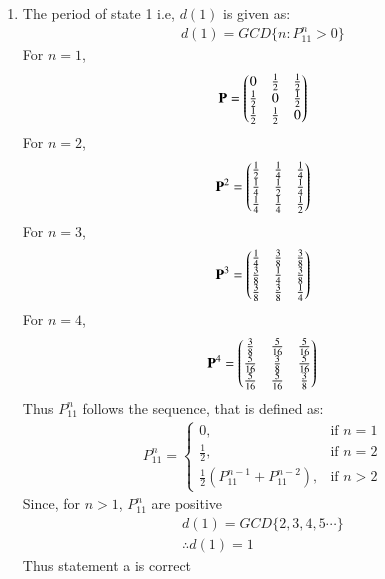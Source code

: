\documentclass[journal,12pt,twocolumn]{IEEEtran}
\begin{document}
    \begin{enumerate}
    \item{ The period of state 1 i.e, $d(1)$ is given as:
    \begin{align}
    d(1)=GCD\{n : P_{11}^n > 0\} \label{eq1a}
    \end{align}
     For $n=1$,
    \begin{align}
    \mathbf{P}=\begin{pmatrix}0&\frac{1}{2}&\frac{1}{2}\\\frac{1}{2}&0&\frac{1}{2}\\\frac{1}{2}&\frac{1}{2}&0\end{pmatrix}\\
    \end{align}
    For $n=2$,
    \begin{align}
    \mathbf{P}^2=\begin{pmatrix}\frac{1}{2}&\frac{1}{4}&\frac{1}{4}\\\frac{1}{4}&\frac{1}{2}&\frac{1}{4}\\\frac{1}{4}&\frac{1}{4}&\frac{1}{2}\end{pmatrix}\\
    \end{align}
    For $n=3$,
    \begin{align}
    \mathbf{P}^3=\begin{pmatrix}\frac{1}{4}&\frac{3}{8}&\frac{3}{8}\\\frac{3}{8}&\frac{1}{4}&\frac{3}{8}\\\frac{3}{8}&\frac{3}{8}&\frac{1}{4}\end{pmatrix}\\
    \end{align}
        For $n=4$,
    \begin{align}
    \mathbf{P}^4=\begin{pmatrix}\frac{3}{8}&\frac{5}{16}&\frac{5}{16}\\\frac{5}{16}&\frac{3}{8}&\frac{5}{16}\\\frac{5}{16}&\frac{5}{16}&\frac{3}{8}\end{pmatrix}
    \end{align}
Thus $P_{11}^n$ follows the sequence, that is defined as:
\begin{align}
    P_{11}^n= 
\begin{cases}
	0,& \text{if } n=1\\
    \frac{1}{2},& \text{if } n=2\\
    \frac{1}{2}(P_{11}^{n-1}+P_{11}^{n-2}),& \text{if } n >2
\end{cases}
\end{align}
    Since, for $n>1$, $P_{11}^n$ are positive 
    \begin{align}
    d(1)=GCD\{2,3,4,5\cdots\}\\
    \therefore d(1)=1 \label{eq1}
    \end{align}
    Thus statement a is correct}\\

\end{enumerate}
\end{document}
